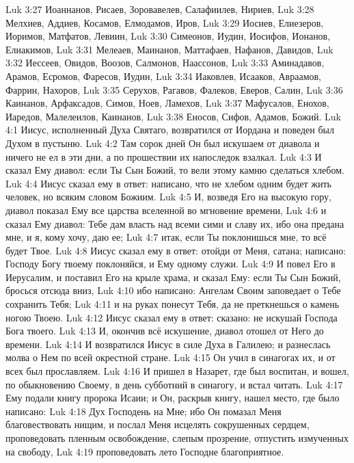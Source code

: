 \vs Luk 3:27 Иоаннанов, Рисаев, Зоровавелев, Салафиилев, Нириев,
\vs Luk 3:28 Мелхиев, Аддиев, Косамов, Елмодамов, Иров,
\vs Luk 3:29 Иосиев, Елиезеров, Иоримов, Матфатов, Левиин,
\vs Luk 3:30 Симеонов, Иудин, Иосифов, Ионанов, Елиакимов,
\vs Luk 3:31 Мелеаев, Маинанов, Маттафаев, Нафанов, Давидов,
\vs Luk 3:32 Иессеев, Овидов, Воозов, Салмонов, Наассонов,
\vs Luk 3:33 Аминадавов, Арамов, Есромов, Фаресов, Иудин,
\vs Luk 3:34 Иаковлев, Исааков, Авраамов, Фаррин, Нахоров,
\vs Luk 3:35 Серухов, Рагавов, Фалеков, Еверов, Салин,
\vs Luk 3:36 Каинанов, Арфаксадов, Симов, Ноев, Ламехов,
\vs Luk 3:37 Мафусалов, Енохов, Иаредов, Малелеилов, Каинанов,
\vs Luk 3:38 Еносов, Сифов, Адамов, Божий.
\vs Luk 4:1 Иисус, исполненный Духа Святаго, возвратился от Иордана и поведен был Духом в пустыню.
\vs Luk 4:2 Там сорок дней Он был искушаем от диавола и ничего не ел в эти дни, а по прошествии их напоследок взалкал.
\vs Luk 4:3 И сказал Ему диавол: если Ты Сын Божий, то вели этому камню сделаться хлебом.
\vs Luk 4:4 Иисус сказал ему в ответ: написано, что не хлебом одним будет жить человек, но всяким словом Божиим.
\vs Luk 4:5 И, возведя Его на высокую гору, диавол показал Ему все царства вселенной во мгновение времени,
\vs Luk 4:6 и сказал Ему диавол: Тебе дам власть над всеми сими  и славу их, ибо она предана мне, и я, кому хочу, даю ее;
\vs Luk 4:7 итак, если Ты поклонишься мне, то всё будет Твое.
\vs Luk 4:8 Иисус сказал ему в ответ: отойди от Меня, сатана; написано: Господу Богу твоему поклоняйся, и Ему одному служи.
\vs Luk 4:9 И повел Его в Иерусалим, и поставил Его на крыле храма, и сказал Ему: если Ты Сын Божий, бросься отсюда вниз,
\vs Luk 4:10 ибо написано: Ангелам Своим заповедает о Тебе сохранить Тебя;
\vs Luk 4:11 и на руках понесут Тебя, да не преткнешься о камень ногою Твоею.
\vs Luk 4:12 Иисус сказал ему в ответ: сказано: не искушай Господа Бога твоего.
\vs Luk 4:13 И, окончив всё искушение, диавол отошел от Него до времени.
\rsbpar\vs Luk 4:14 И возвратился Иисус в силе Духа в Галилею; и разнеслась молва о Нем по всей окрестной стране.
\vs Luk 4:15 Он учил в синагогах их, и от всех был прославляем.
\rsbpar\vs Luk 4:16 И пришел в Назарет, где был воспитан, и вошел, по обыкновению Своему, в день субботний в синагогу, и встал читать.
\vs Luk 4:17 Ему подали книгу пророка Исаии; и Он, раскрыв книгу, нашел место, где было написано:
\vs Luk 4:18 Дух Господень на Мне; ибо Он помазал Меня благовествовать нищим, и послал Меня исцелять сокрушенных сердцем, проповедовать пленным освобождение, слепым прозрение, отпустить измученных на свободу,
\vs Luk 4:19 проповедовать лето Господне благоприятное.
